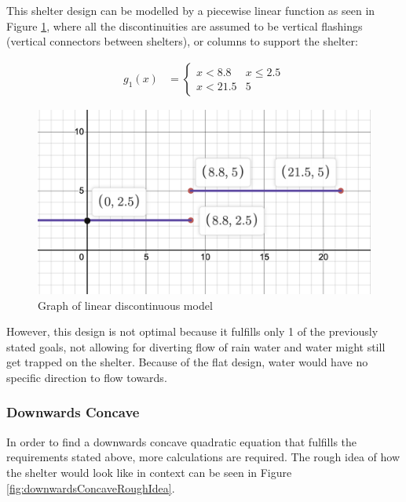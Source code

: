 \documentclass[a4paper,titlepage]{article}
\begin{document}
This shelter design can be modelled by a piecewise linear function as seen in Figure \ref{fig:linearDiscontinuousGraph}, where all the discontinuities are assumed to be vertical flashings (vertical connectors between shelters), or columns to support the shelter:

\begin{align}
    g_1(x)&=\begin{cases} 
      x<8.8 & x\leq 2.5 \\
      x<21.5 & 5
   \end{cases}
\end{align}

\begin{figure}[htbp]
    \centering
    \includegraphics[width=\textwidth]{linearDiscontinuousGraph.png}
    \caption{Graph of linear discontinuous model}
    \label{fig:linearDiscontinuousGraph}
\end{figure}

However, this design is not optimal because it fulfills only 1 of the previously stated goals, not allowing for diverting flow of rain water and water might still get trapped on the shelter. Because of the flat design, water would have no specific direction to flow towards.

\subsubsection{Downwards Concave}

In order to find a downwards concave quadratic equation that fulfills the requirements stated above, more calculations are required. The rough idea of how the shelter would look like in context can be seen in Figure \ref{fig:downwardsConcaveRoughIdea}.
\end{document}
